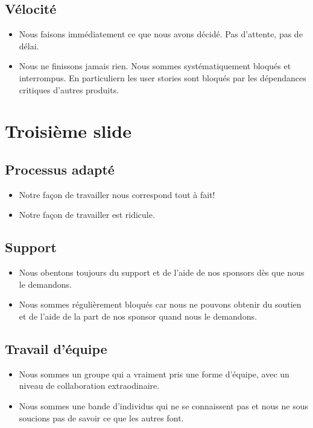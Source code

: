 \subsection{Vélocité}\hypertarget{vlocit}{}\label{vlocit}

\begin{itemize}
\item Nous faisons immédiatement ce que nous avons décidé. Pas d'attente, pas de délai.
\item Nous ne finissons jamais rien. Nous sommes systématiquement bloqués et interrompus. En particuliern les user stories sont bloqués par les dépendances critiques d'autres produits.
\end{itemize}

\section{Troisième slide}\hypertarget{troisime-slide}{}\label{troisime-slide}

\subsection{Processus adapté}\hypertarget{processus-adapt}{}\label{processus-adapt}

\begin{itemize}
\item Notre façon de travailler nous correspond tout à fait!
\item Notre façon de travailler est ridicule.
\end{itemize}

\subsection{Support}\hypertarget{support}{}\label{support}

\begin{itemize}
\item Nous obentons toujours du support et de l'aide de nos sponsors dès que nous le demandons.
\item Nous sommes régulièrement bloqués car nous ne pouvons obtenir du soutien et de l'aide de la part de nos sponsor quand nous le demandons.
\end{itemize}

\subsection{Travail d'équipe}\hypertarget{travail-dquipe}{}\label{travail-dquipe}

\begin{itemize}
\item Nous sommes un groupe qui a vraiment pris une forme d'équipe, avec un niveau de collaboration extraodinaire.
\item Nous sommes une bande d'individus qui ne se connaissent pas et nous ne sous soucions pas de savoir ce que les autres font.
\end{itemize}
